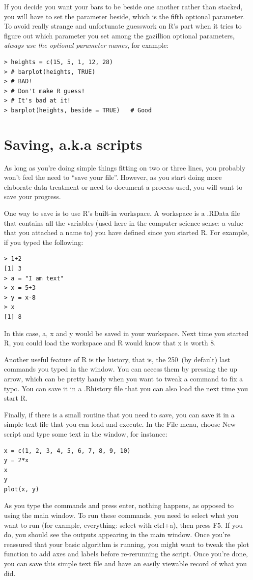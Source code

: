 \documentclass{report}
\newcommand{\code}[1]{\textsf{\ttfamily #1}}
\begin{document}
	If you decide you want your bars to be beside one another rather than stacked, you will have to set the parameter \code{beside}, which is the fifth optional parameter. To avoid really strange and unfortunate guesswork on R's part when it tries to figure out which parameter you set among the gazillion optional parameters, \emph{always use the optional parameter names}, for example:
	\begin{verbatim}
> heights = c(15, 5, 1, 12, 28)
> # barplot(heights, TRUE) 
> # BAD! 
> # Don't make R guess! 
> # It's bad at it!
> barplot(heights, beside = TRUE)	# Good
	\end{verbatim}
	
	\section{Saving, a.k.a scripts}
	As long as you're doing simple things fitting on two or three lines, you probably won't feel the need to ``save your file''. However, as you start doing more elaborate data treatment or need to document a process used, you will want to save your progress.
	
	One way to save is to use R's built-in \code{workspace}. A \code{workspace} is a \code{.RData} file that contains all the variables (used here in the computer science sense: a value that you attached a name to) you have defined since you started R. For example, if you typed the following:
	\begin{verbatim}
> 1+2
[1] 3
> a = "I am text"
> x = 5+3
> y = x-8
> x
[1] 8
	\end{verbatim}
	In this case, \code{a}, \code{x} and \code{y} would be saved in your workspace. Next time you started R, you could load the \code{workspace} and R would know that x is worth 8.
	
	Another useful feature of R is the history, that is, the 250~(by default) last commands you typed in the window. You can access them by pressing the up arrow, which can be pretty handy when you want to tweak a command to fix a typo. You can save it in a \code{.Rhistory} file that you can also load the next time you start R.
	
	Finally, if there is a small routine that you need to save, you can save it in a simple text file that you can load and execute. In the \code{File} menu, choose \code{New script} and type some text in the window, for instance:
	\begin{verbatim}
x = c(1, 2, 3, 4, 5, 6, 7, 8, 9, 10)
y = 2*x
x
y
plot(x, y)
	\end{verbatim}
	As you type the commands and press enter, nothing happens, as opposed to using the main window. To run these commands, you need to select what you want to run (for example, everything: select with ctrl+a), then press F5. If you do, you should see the outputs appearing in the main window. Once you're reassured that your basic algorithm is running, you might want to tweak the plot function to add axes and labels before re-rerunning the script. Once you're done, you can save this simple text file and have an easily viewable record of what you did.
	
\end{document}
